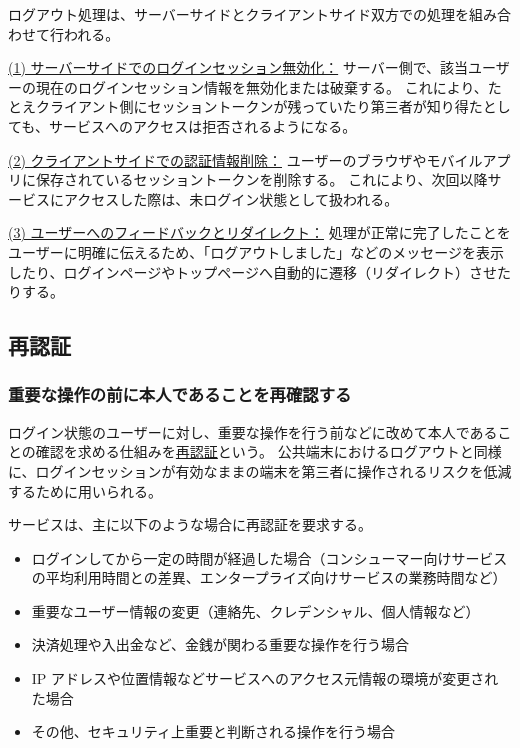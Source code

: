 \documentclass[uplatex]{jsarticle}
\def\label#1{}%
\begin{document}
ログアウト処理は、サーバーサイドとクライアントサイド双方での処理を組み合わせて行われる。

\underline{(1) サーバーサイドでのログインセッション無効化：}
サーバー側で、該当ユーザーの現在のログインセッション情報を無効化または破棄する。
これにより、たとえクライアント側にセッショントークンが残っていたり第三者が知り得たとしても、サービスへのアクセスは拒否されるようになる。

\underline{(2) クライアントサイドでの認証情報削除：}
ユーザーのブラウザやモバイルアプリに保存されているセッショントークンを削除する。
これにより、次回以降サービスにアクセスした際は、未ログイン状態として扱われる。

\underline{(3) ユーザーへのフィードバックとリダイレクト：}
処理が正常に完了したことをユーザーに明確に伝えるため、「ログアウトしました」などのメッセージを表示したり、ログインページやトップページへ自動的に遷移（リダイレクト）させたりする。

\subsection{再認証}

\subsubsection{重要な操作の前に本人であることを再確認する}

\begin{dfn}[再認証]\label{dfn:reauthentication}
ログイン状態のユーザーに対し、重要な操作を行う前などに改めて本人であることの確認を求める仕組みを\underline{再認証}という。
公共端末におけるログアウトと同様に、ログインセッションが有効なままの端末を第三者に操作されるリスクを低減するために用いられる。
\end{dfn}

\begin{exa}[再認証が要求される場合]\label{exa:ch3-reauth-triggers}
サービスは、主に以下のような場合に再認証を要求する。
\begin{itemize}
\item ログインしてから一定の時間が経過した場合（コンシューマー向けサービスの平均利用時間との差異、エンタープライズ向けサービスの業務時間など）
\item 重要なユーザー情報の変更（連絡先、クレデンシャル、個人情報など）
\item 決済処理や入出金など、金銭が関わる重要な操作を行う場合
\item IP アドレスや位置情報などサービスへのアクセス元情報の環境が変更された場合
\item その他、セキュリティ上重要と判断される操作を行う場合
\end{itemize}
\end{exa}
\end{document}
